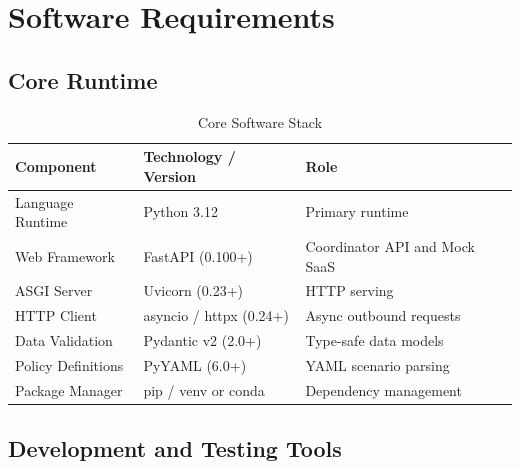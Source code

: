 \documentclass[12pt,a4paper]{report}
\begin{document}
\section{Software Requirements}

\subsection{Core Runtime}

\begin{table}[H]
    \centering
    \caption{Core Software Stack}
    \label{tab:tech-stack}
    \begin{tabular}{lll}
        \toprule
        \textbf{Component}         & \textbf{Technology / Version}          & \textbf{Role}                    \\
        \midrule
        Language Runtime           & Python 3.12                            & Primary runtime                  \\[4pt]
        Web Framework              & FastAPI (0.100+)                       & Coordinator API and Mock SaaS    \\[4pt]
        ASGI Server                & Uvicorn (0.23+)                        & HTTP serving                     \\[4pt]
        HTTP Client                & asyncio / httpx (0.24+)                & Async outbound requests          \\[4pt]
        Data Validation            & Pydantic v2 (2.0+)                     & Type-safe data models            \\[4pt]
        Policy Definitions         & PyYAML (6.0+)                          & YAML scenario parsing            \\[4pt]
        Package Manager            & pip / venv or conda                    & Dependency management            \\
        \bottomrule
    \end{tabular}
\end{table}

\subsection{Development and Testing Tools}
\end{document}
